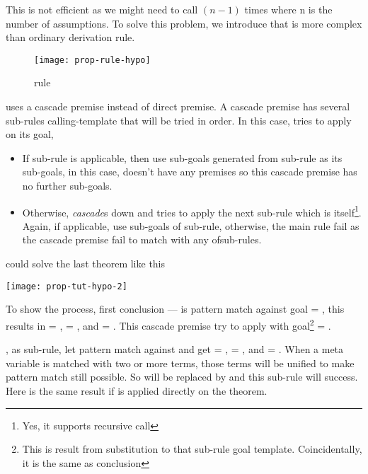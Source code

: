 \documentclass[master.tex]{subfiles}
\begin{document}
This is not efficient as we might need to call  $(n - 1)$
times where n is the number of assumptions. To solve this problem, we introduce
  that is more complex than ordinary derivation rule.


\begin{figure}[H]
\begin{minipage}{\textwidth}
    \centering
\texttt{[image: prop-rule-hypo]}
\end{minipage}
    \caption{rule }
\label{fig:prop-rule-hypothesis}
\end{figure}

 uses a cascade premise instead of direct premise. A cascade
premise has several sub-rules calling-template that will be tried in order. In
this case,  tries to apply  on its
goal,
\begin{itemize}
\item If sub-rule is applicable, then use sub-goals generated from sub-rule as
  its sub-goals, in this case,  doesn't have any premises
  so this cascade premise has no further sub-goals.
\item Otherwise, \emph{cascade}s down and tries to apply the next sub-rule which
  is  itself\footnote{Yes, it supports recursive call}. Again,
  if applicable, use sub-goals of sub-rule, otherwise, the main
   rule fail as the cascade premise fail to match with any
  ofsub-rules.
\end{itemize}

 could solve the last theorem like this

\begin{center}
\texttt{[image: prop-tut-hypo-2]}
\end{center}

To show the process, first  conclusion ---
 is pattern match against goal = ,
this results in  = ,  =
, and \pvar{$\Gamma$} = . This
cascade premise try to apply  with goal\footnote{This is
  result from substitution to that sub-rule goal template. Coincidentally, it is
  the same as  conclusion} = .

, as sub-rule, let  pattern match
against  and get  = ,
 = , and \pvar{$\Gamma$} = .
When a meta variable is matched with two or more terms, those terms will be
unified to make pattern match still possible. So  will be
replaced by  and this sub-rule will success. Here is the
same result if  is applied directly on the theorem.
\end{document}
